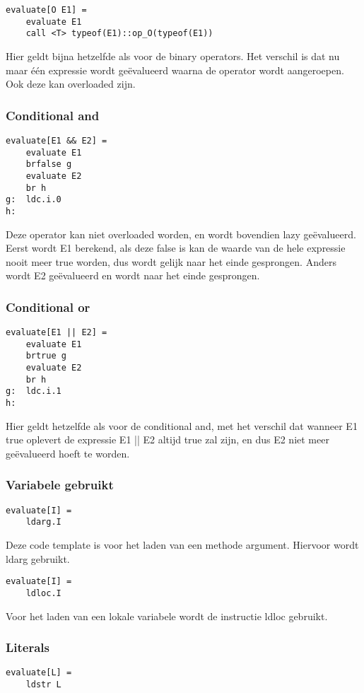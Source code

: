 \begin{lstlisting}
evaluate[O E1] =
	evaluate E1
	call <T> typeof(E1)::op_O(typeof(E1))
\end{lstlisting}
Hier geldt bijna hetzelfde als voor de binary operators. Het verschil is dat nu maar \'e\'en expressie wordt ge\"evalueerd waarna de operator wordt aangeroepen. Ook deze kan overloaded zijn.

\subsubsection{Conditional and}
\begin{lstlisting}
evaluate[E1 && E2] =
	evaluate E1
	brfalse g
	evaluate E2
	br h
g:	ldc.i.0
h:
\end{lstlisting}
Deze operator kan niet overloaded worden, en wordt bovendien lazy ge\"evalueerd. Eerst wordt E1 berekend, als deze false is kan de waarde van de hele expressie nooit meer true worden, dus wordt gelijk naar het einde gesprongen. Anders wordt E2 ge\"evalueerd en wordt naar het einde gesprongen.

\subsubsection{Conditional or}
\begin{lstlisting}
evaluate[E1 || E2] =
	evaluate E1
	brtrue g
	evaluate E2
	br h
g:	ldc.i.1
h:
\end{lstlisting}
Hier geldt hetzelfde als voor de conditional and, met het verschil dat wanneer E1 true oplevert de expressie E1 || E2 altijd true zal zijn, en dus E2 niet meer ge\"evalueerd hoeft te worden.

\subsubsection{Variabele gebruikt}
\begin{lstlisting}
evaluate[I] =
	ldarg.I
\end{lstlisting}
Deze code template is voor het laden van een methode argument. Hiervoor wordt ldarg gebruikt.

\begin{lstlisting}
evaluate[I] =
	ldloc.I
\end{lstlisting}
Voor het laden van een lokale variabele wordt de instructie ldloc gebruikt.

\subsubsection{Literals}
\begin{lstlisting}
evaluate[L] =
	ldstr L
\end{lstlisting}

